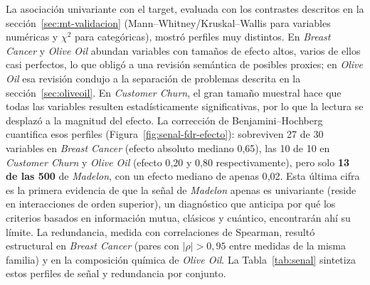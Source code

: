 La asociación univariante con el target, evaluada con los contrastes
descritos en la sección~\ref{sec:mt-validacion}
(Mann--Whitney/Kruskal--Wallis para variables numéricas y $\chi^2$ para
categóricas), mostró perfiles muy distintos. En \textit{Breast Cancer}
y \textit{Olive Oil} abundan variables con tamaños de efecto altos,
varios de ellos casi perfectos, lo que obligó a una revisión semántica
de posibles proxies; en \textit{Olive Oil} esa revisión condujo a la
separación de problemas descrita en la
sección~\ref{sec:oliveoil}. En \textit{Customer Churn}, el gran tamaño
muestral hace que todas las variables resulten estadísticamente
significativas, por lo que la lectura se desplazó a la magnitud del
efecto. La corrección de Benjamini--Hochberg~\cite{benjamini1995}
cuantifica esos perfiles (Figura~\ref{fig:senal-fdr-efecto}): sobreviven
27 de 30 variables en \textit{Breast
Cancer} (efecto absoluto mediano 0{,}65), las 10 de 10 en \textit{Customer
Churn} y \textit{Olive Oil} (efecto 0{,}20 y 0{,}80 respectivamente), pero
solo \textbf{13 de las 500} de \textit{Madelon}, con un efecto mediano de
apenas 0{,}02. Esta última cifra es la primera evidencia de que la señal
de \textit{Madelon} apenas es univariante (reside en interacciones de
orden superior), un diagnóstico que anticipa por qué los criterios
basados en información mutua, clásicos y cuántico, encontrarán ahí su
límite. La redundancia, medida con correlaciones de Spearman, resultó
estructural en \textit{Breast Cancer} (pares con $|\rho| > 0{,}95$ entre
medidas de la misma familia) y en la composición química de
\textit{Olive Oil}. La Tabla~\ref{tab:senal} sintetiza estos perfiles
de señal y redundancia por conjunto.

\begin{table}[!htbp]
  \centering
  \caption[Señal univariante y redundancia por conjunto]{Señal
    univariante y redundancia de los datos crudos. ``Signif.\ FDR'' es el
    número de variables que conservan asociación con el target tras la
    corrección de Benjamini--Hochberg sobre las contrastadas; el efecto
    mediano es el tamaño de efecto absoluto (delta de Cliff en problemas
    binarios numéricos, V de Cramér en categóricas y épsilon cuadrado en
    multiclase); la última columna cuenta los pares de variables con
    correlación de Spearman $|\rho|\ge0{,}85$.}
  \label{tab:senal}
  \scriptsize
\end{table}
\FloatBarrier

